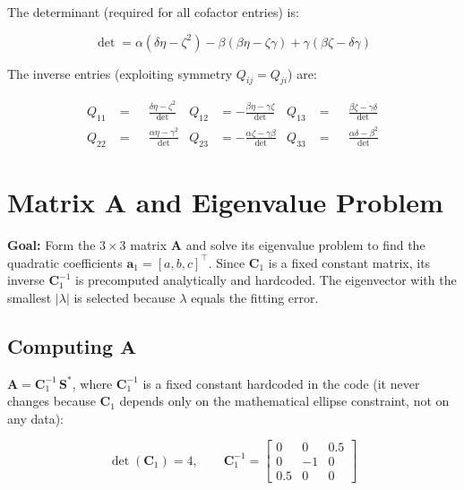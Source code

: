 \documentclass{article}
\begin{document}
	The determinant (required for all cofactor entries) is:
	
	\begin{equation}
		\det = \alpha(\delta\eta - \zeta^2)
		- \beta(\beta\eta - \zeta\gamma)
		+ \gamma(\beta\zeta - \delta\gamma)
	\end{equation}
	
	The inverse entries (exploiting symmetry $Q_{ij} = Q_{ji}$) are:
	
	\begin{align}
		Q_{11} &= \phantom{-}\frac{\delta\eta - \zeta^2}{\det} &
		Q_{12} &= -\frac{\beta\eta - \gamma\zeta}{\det} &
		Q_{13} &= \phantom{-}\frac{\beta\zeta - \gamma\delta}{\det} \\[6pt]
		Q_{22} &= \phantom{-}\frac{\alpha\eta - \gamma^2}{\det} &
		Q_{23} &= -\frac{\alpha\zeta - \gamma\beta}{\det} &
		Q_{33} &= \phantom{-}\frac{\alpha\delta - \beta^2}{\det}
	\end{align}
	

	\section{Matrix $\mathbf{A}$ and Eigenvalue Problem}
	
	
	\textbf{Goal:} Form the $3\times3$ matrix $\mathbf{A}$ and
	solve its eigenvalue problem to find the quadratic coefficients
	$\mathbf{a}_1 = [a,b,c]^\top$.
	Since $\mathbf{C}_1$ is a fixed constant matrix,
	its inverse $\mathbf{C}_1^{-1}$ is precomputed analytically
	and hardcoded.
	The eigenvector with the smallest $|\lambda|$ is selected
	because $\lambda$ equals the fitting error.
	
	\subsection{Computing $\mathbf{A}$}
	
	$\mathbf{A} = \mathbf{C}_1^{-1}\,\mathbf{S}^*$, where
	$\mathbf{C}_1^{-1}$ is a fixed constant hardcoded in the code
	(it never changes because $\mathbf{C}_1$ depends only on the
	mathematical ellipse constraint, not on any data):
	
	\begin{equation}
		\det(\mathbf{C}_1) = 4, \qquad
		\mathbf{C}_1^{-1} =
		\begin{bmatrix}
			0   & 0   & 0.5 \\
			0   & -1  & 0   \\
			0.5 & 0   & 0
		\end{bmatrix}
	\end{equation}
	
\end{document}
